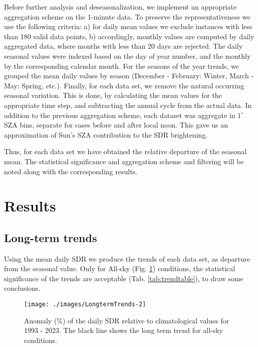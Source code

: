 \documentclass[
  preprint, 3p, authoryear]{article}
\begin{document}
Before further analysis and deseasonalization, we implement an appropriate aggregation scheme on the 1-minute data. To preserve the representativeness we use the following criteria:
a) for daily mean values we exclude instances with less than 180 valid data points,
b) accordingly, monthly values are computed by daily aggregated data, where months with less than 20 days are rejected.
The daily seasonal values were indexed based on the day of year number, and the monthly by the corresponding calendar month.
For the seasons of the year trends, we grouped the mean daily values by season (December - February: Winter, March - May: Spring, etc.).
Finally, for each data set, we remove the natural occurring seasonal variation.
This is done, by calculating the mean values for the appropriate time step, and subtracting the annual cycle from the actual data.
In addition to the previous aggregation scheme, each dataset was aggregate in \(1^\circ\) SZA bins, separate for cases before and after local noon.
This gave us an approximation of Sun's SZA contribution to the SDR brightening.

Thus, for each data set we have obtained the relative departure of the seasonal mean.
The statistical significance and aggregation scheme and filtering will be noted along with the corresponding results.

\hypertarget{results}{%
\section{Results}\label{results}}

\hypertarget{long-term-trends}{%
\subsection{Long-term trends}\label{long-term-trends}}

Using the mean daily SDR we produce the trends of each data set, as departure from the seasonal value.
Only for All-sky (Fig. \ref{fig:trendALL}) conditions, the statistical significance of the trends are acceptable (Tab. \ref{tab:trendtable}), to draw some conclusions.

\begin{figure}[h!]

{\centering \texttt{[image: ./images/LongtermTrends-2]} 

}

\caption{Anomaly (\%) of the daily SDR relative to climatological values for 1993 - 2023. The black line shows the long term trend for all-sky conditions.}\label{fig:trendALL}
\end{figure}
\end{document}
